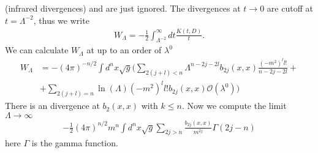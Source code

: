 (infrared divergences) and are just ignored. The divergences at $t\rightarrow 0$
are cutoff at $t=\Lambda^{-2}$, thus we write
\begin{align}
    W_\Lambda = -\frac{1}{2} \int_{\Lambda^{-2}}^\infty dt \frac{K(t, D)}{t}.
\end{align}
We can calculate $W_\Lambda$ at up to an order of $\lambda ^0$
\begin{align}
    W_\Lambda &= -(4\pi)^{-n/2} \int d^n x\sqrt{g}\bigg(
    \sum_{2(j+l)<n}\Lambda^{n-2j-2l}b_{2j}(x,x) \frac{(-m^2)^l l!}{n-2j-2l} +\\
    &+ \sum_{2(j+l) =n }\ln(\Lambda) (-m^2)^l l! b_{2j}(x,x)
    \mathcal{O}(\lambda^0) \bigg)
\end{align}
There is an divergence at $b_2(x,x)$ with $k\leq n$. Now we compute the limit
$\Lambda \rightarrow \infty$
\begin{align}
    -\frac{1}{2}(4\pi)^{n/2}m^n\int d^n x\sqrt{g} \sum_{2j>n}
    \frac{b_{2j}(x,x)}{m^{2j}}\Gamma(2j-n)
\end{align}
here $\Gamma$ is the gamma function.
